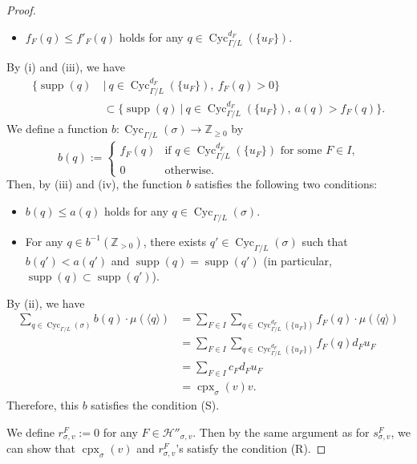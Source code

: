 \begin{proof}
\begin{itemize}
\item[(iii)] 
$f_F (q) \le f'_F(q)$ holds for any $q \in \operatorname{Cyc}_{\Gamma /L}^{d_F} (\{ u_F \})$. 
\end{itemize}
By (i) and (iii), we have  
\begin{align*}\tag{iv}
\bigl\{ \operatorname{supp}(q) \ &\big| \  q \in \operatorname{Cyc}_{\Gamma /L}^{d_F} (\{ u_F \}),\ f_F(q)>0 \bigr \} \\
&\subset \bigl\{ \operatorname{supp}(q) \ \big| \  q \in \operatorname{Cyc}_{\Gamma /L}^{d_F} (\{ u_F \}),\ a(q)>f_F(q) \bigr \}. 
\end{align*}
We define a function $b : \operatorname{Cyc}_{\Gamma /L}(\sigma) \to \mathbb{Z}_{\ge 0}$ by 
\[
b(q) := 
\begin{cases}
f_F(q) & \text{if $q \in \operatorname{Cyc}_{\Gamma /L}^{d_F} (\{ u_F \})$ for some $F \in I$,}\\
0 & \text{otherwise.}
\end{cases}
\]
Then, by (iii) and (iv), the function $b$ satisfies the following two conditions:
\begin{itemize}
\item 
$b(q) \le a(q)$ holds for any $q \in \operatorname{Cyc}_{\Gamma /L}(\sigma)$. 

\item 
For any $q \in b^{-1}(\mathbb{Z}_{>0})$, 
there exists $q' \in \operatorname{Cyc}_{\Gamma /L}(\sigma)$ 
such that $b(q') < a(q')$ and $\operatorname{supp}(q) = \operatorname{supp}(q')$ 
(in particular, $\operatorname{supp}(q) \subset \operatorname{supp}(q')$).
\end{itemize}
By (ii), we have 
\begin{align*}
\sum _{q \in \operatorname{Cyc}_{\Gamma /L}(\sigma)} b(q) \cdot \mu (\langle q \rangle) 
&= \sum _{F \in I} \sum _{q \in \operatorname{Cyc}_{\Gamma /L}^{d_F} (\{ u_F \})} f_F(q) \cdot \mu (\langle q \rangle) \\
&= \sum _{F \in I} \sum _{q \in \operatorname{Cyc}_{\Gamma /L}^{d_F} (\{ u_F \})} f_F(q) d_F u_F \\
&= \sum_{F \in I} c_F d_F u_{F} \\
&= \operatorname{cpx}_{\sigma}(v) v. 
\end{align*}
Therefore, this $b$ satisfies the condition (S). 

We define $r_{\sigma, v}^F := 0$ for any $F \in \mathcal{H}''_{\sigma , v}$. 
Then by the same argument as for $s_{\sigma, v}^F$, we can show that 
$\operatorname{cpx}_{\sigma}(v)$ and $r_{\sigma, v}^F$'s satisfy the condition (R).
\end{proof}

